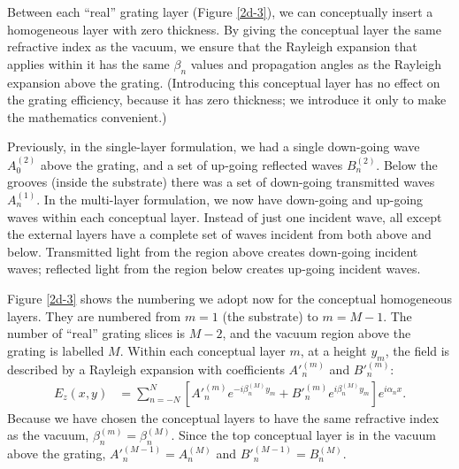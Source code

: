 Between each ``real'' grating layer (Figure \ref{2d-3}), we can conceptually insert a homogeneous layer with zero thickness.  By giving the conceptual layer the same refractive index as the vacuum, we ensure that the Rayleigh expansion that applies within it has the same $\beta_n$ values and propagation angles as the Rayleigh expansion above the grating.  (Introducing this conceptual layer has no effect on the grating efficiency, because it has zero thickness; we introduce it only to make the mathematics convenient.)

Previously, in the single-layer formulation, we had a single down-going wave $A^{(2)}_0$ above the grating, and a set of up-going reflected waves $B^{(2)}_n$.  Below the grooves (inside the substrate) there was a set of down-going transmitted waves $A^{(1)}_n$.  In the multi-layer formulation, we now have down-going and up-going waves within each conceptual layer.  Instead of just one incident wave, all except the external layers have a complete set of waves incident from both above and below.  Transmitted light from the region above creates down-going incident waves; reflected light from the region below creates up-going incident waves.

Figure \ref{2d-3} shows the numbering we adopt now for the conceptual homogeneous layers.  They are numbered from $m=1$ (the substrate) to $m=M-1$.  The number of ``real'' grating slices is $M-2$, and the vacuum region above the grating is labelled  $M$.  Within each conceptual layer $m$, at a height $y_m$, the field is described by a Rayleigh expansion with coefficients $A'^{(m)}_n$ and $B'^{(m)}_n$:
\begin{align}
E_z(x,y) &= \sum\limits_{n=-N}^{N} \left[ A'^{(m)}_n  e^{-i \beta^{(M)}_n y_m}   +  B'^{(m)}_n e^{i \beta^{(M)}_n y_m} \right] e^{i \alpha_n x}.
\label{rayleighS}
\end{align}
Because we have chosen the conceptual layers to have the same refractive index as the vacuum, $\beta^{(m)}_n = \beta^{(M)}_n$.  Since the top conceptual layer is in the vacuum above the grating, $A'^{(M-1)}_n = A^{(M)}_n$ and $B'^{(M-1)}_n = B^{(M)}_n$.

